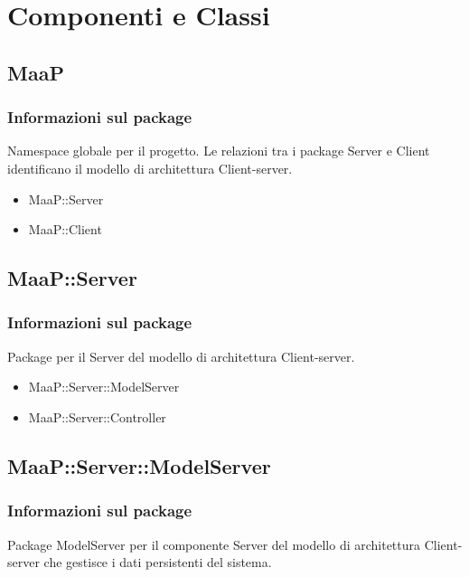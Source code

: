 \section{Componenti e Classi}

\subsection{MaaP}
\subsubsection{Informazioni sul package}
Namespace globale per il progetto. Le relazioni tra i package Server e Client identificano il modello di architettura Client-server.
\begin{itemize}
\item MaaP::Server
\item MaaP::Client
\end{itemize}

\subsection{MaaP::Server}
\subsubsection{Informazioni sul package}
Package per il  Server del modello di architettura Client-server.
\begin{itemize}
\item MaaP::Server::ModelServer
\item MaaP::Server::Controller
\end{itemize}

\subsection{MaaP::Server::ModelServer}
\subsubsection{Informazioni sul package}
Package ModelServer per il componente Server del modello di architettura Client-server che gestisce i dati persistenti del sistema.

